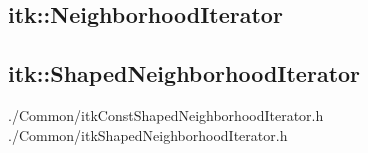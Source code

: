 
\subsection{itk::NeighborhoodIterator}
\label{sec:itkNeighborhoodIterator}

% 




\subsection{itk::ShapedNeighborhoodIterator}
\label{sec:itkShapedNeighborhoodIterator}
./Common/itkConstShapedNeighborhoodIterator.h
./Common/itkShapedNeighborhoodIterator.h


